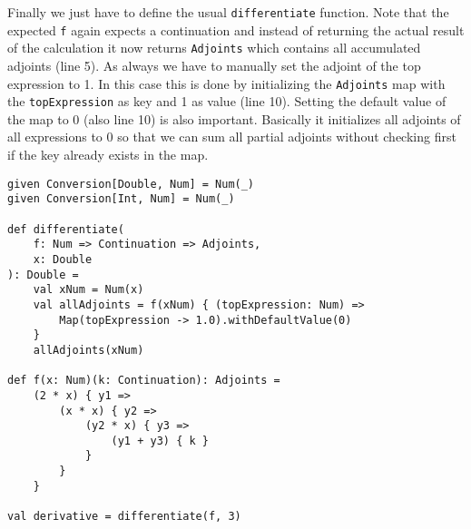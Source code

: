 Finally we just have to define the usual \lstinline{differentiate} function. Note that the expected \lstinline{f} again expects a continuation and instead of returning the actual result of the calculation it now returns \lstinline{Adjoints} which contains all accumulated adjoints (line 5). As always we have to manually set the adjoint of the top expression to 1. In this case this is done by initializing the \lstinline{Adjoints} map with the \lstinline{topExpression} as key and 1 as value (line 10). Setting the default value of the map to 0 (also line 10) is also important. Basically it initializes all adjoints of all expressions to 0 so that we can sum all partial adjoints without checking first if the key already exists in the map.
\begin{lstlisting}
given Conversion[Double, Num] = Num(_)
given Conversion[Int, Num] = Num(_)

def differentiate(
    f: Num => Continuation => Adjoints, 
    x: Double
): Double =
    val xNum = Num(x)
    val allAdjoints = f(xNum) { (topExpression: Num) =>
        Map(topExpression -> 1.0).withDefaultValue(0)
    }
    allAdjoints(xNum)

def f(x: Num)(k: Continuation): Adjoints =
    (2 * x) { y1 =>
        (x * x) { y2 =>
            (y2 * x) { y3 =>
                (y1 + y3) { k }
            }
        }
    }

val derivative = differentiate(f, 3)
\end{lstlisting}
